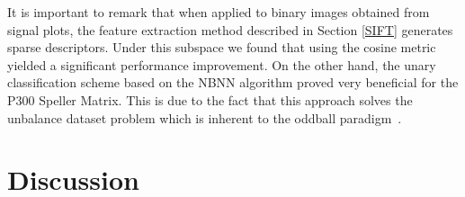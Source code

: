 \documentclass[utf8]{frontiersSCNS} %
\begin{document}
It is important to remark that when applied to binary images obtained from signal plots, the feature extraction method described in Section \ref{SIFT} generates sparse descriptors.  Under this subspace we found that using the cosine metric yielded a significant performance improvement. On the other hand, the unary classification scheme based on the NBNN algorithm proved very beneficial for the P300 Speller Matrix.  This is due to the fact that this approach solves the unbalance dataset problem which is inherent to the oddball paradigm~\citep{Tibon2015}.  


\section{Discussion}
\label{discussion}




\end{document}
